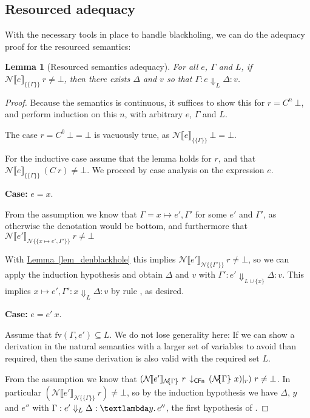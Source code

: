 \documentclass{jfp1}
\newcommand{\myref}[2]{\hyperref[#2]{#1~\ref*{#2}}}
\newtheorem{lemma}{Lemma}
\theoremstyle{nonumberbreak}
\newtheorem{proof}{Proof}
\newcommand{\sCFnProj}[2]{#1\,\downarrow_{\text{\textsf{CFn}}}\,#2}
\newcommand{\sLam}[2]{\text{\textlambda} #1.\, #2}
\newcommand{\sred}[5]{#1 : #2 \Downarrow_{#3} #4 : #5}
\newcommand{\sRule}[1]{\text{{\textsc{#1}}}}
\newcommand{\fv}[1]{\text{fv}(#1)}
\newcommand{\esem}[1]{\{\!\!\!\{#1\}\!\!\!\}}
\newcommand{\dsemr}[2]{\mathcal N\!\llbracket #1 \rrbracket_{#2}}
\newcommand{\esemr}[1]{\mathcal N\!\!\{\!\!\!\{#1\}\!\!\!\}}
\newcommand{\Crestr}[2]{ #1 |_{#2}}
\newcommand{\case}[1]{\par\smallskip\noindent\textbf{Case:} #1\nopagebreak\par\noindent\ignorespaces}
\begin{document}
\subsection{Resourced adequacy}

With the necessary tools in place to handle blackholing, we can do the adequacy proof for the resourced semantics:

\begin{lemma}[Resourced semantics adequacy]
\label{lem_resad}
For all $e$, $\Gamma$ and $L$,  if $\dsemr{e}{\esem{\Gamma}}~r \ne \bot$, then there exists $\Delta$ and $v$ so that $\sred \Gamma e L \Delta v$.
\end{lemma}

\begin{proof}
Because the semantics is continuous, it suffices to show this for $r = C^n~\bot$, and perform induction on this $n$, with arbitrary $e$, $\Gamma$ and $L$.

The case $r=C^0~\bot = \bot$ is vacuously true, as $\dsemr{e}{\esem{\Gamma}}~\bot = \bot$.

For the inductive case assume that the lemma holds for $r$, and that $\dsemr{e}{\esem{\Gamma}}~(C~r) \ne \bot$. We proceed by case analysis on the expression $e$.

\case{$e = x$.}
From the assumption we know that $\Gamma = x\mapsto e',\Gamma'$ for some $e'$ and $\Gamma'$, as otherwise the denotation would be bottom, and furthermore that $\dsemr{e'}{\esemr{x\mapsto e',\Gamma'}}~r \ne\bot$

With \myref{Lemma}{lem_denblackhole} this implies $\dsemr{e'}{\esemr{\Gamma'}}~r \ne\bot$, so we can apply the induction hypothesis and obtain $\Delta$ and $v$ with $\sred {\Gamma'} {e'} {L\cup\{x\}} \Delta v$. This implies $\sred {x\mapsto e',\Gamma'} {x} {L} \Delta v$ by rule \sRule{Var}, as desired.

\case{$e = e'~x$.}
Assume that $\fv{\Gamma, e'} \subseteq L$. We do not lose generality here: If we can show a derivation in the natural semantics with a larger set of variables to avoid than required, then the same derivation is also valid with the required set $L$.

From the assumption we know that
$\sCFnProj {(\dsemr {e'} {\esemr{\Gamma}}~r}{\Crestr{({\esemr{\Gamma}}~x)}{r}})~r \ne \bot$. In particular $(\dsemr {e'} {\esemr{\Gamma}}~r)\ne \bot$, so by the induction hypothesis we have $\Delta$, $y$ and $e''$ with $\sred{\Gamma}{e'}L\Delta {\sLam y {e''}}$, the first hypothesis of \sRule{App}.


\end{proof}
\end{document}
